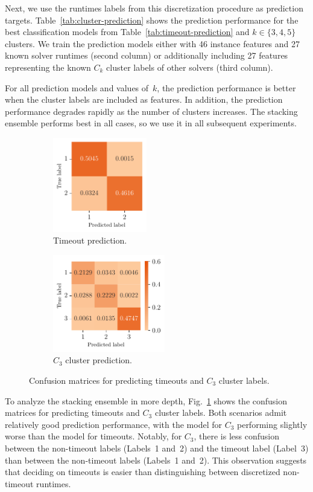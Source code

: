 \documentclass[sn-basic, Numbered]{sn-jnl} %
\begin{document}
Next, we use the runtimes labels from this discretization procedure as prediction targets.
Table~\ref{tab:cluster-prediction} shows the prediction performance for the best classification models from Table~\ref{tab:timeout-prediction} and $k \in \lbrace 3, 4, 5 \rbrace$ clusters.
We train the prediction models either with 46 instance features and 27 known solver runtimes (second column) or additionally including 27 features representing the known $C_k$ cluster labels of other solvers (third column).

For all prediction models and values of~$k$, the prediction performance is better when the cluster labels are included as features.
In addition, the prediction performance degrades rapidly as the number of clusters increases.
The stacking ensemble performs best in all cases, so we use it in all subsequent experiments.

\begin{figure}[tb]
	\centering
	\begin{subfigure}{0.45\textwidth}
		\centering
		\includegraphics[height=4.123cm]{plots/cm2labels.pdf}
		\caption{Timeout prediction.}
	\end{subfigure}
	\begin{subfigure}{0.45\textwidth}
		\centering
		\includegraphics[height=4.228cm]{plots/cm3labels.pdf}
		\caption{$C_3$ cluster prediction.}
	\end{subfigure}
	\caption{Confusion matrices for predicting timeouts and $C_3$ cluster labels.}
	\label{fig:confusion-matrices}
\end{figure}

To analyze the stacking ensemble in more depth, Fig.~\ref{fig:confusion-matrices} shows the confusion matrices for predicting timeouts and $C_3$ cluster labels.
Both scenarios admit relatively good prediction performance, with the model for $C_3$ performing slightly worse than the model for timeouts.
Notably, for $C_3$, there is less confusion between the non-timeout labels (Labels~1 and~2) and the timeout label (Label~3) than between the non-timeout labels (Labels~1 and~2).
This observation suggests that deciding on timeouts is easier than distinguishing between discretized non-timeout runtimes.
\end{document}
